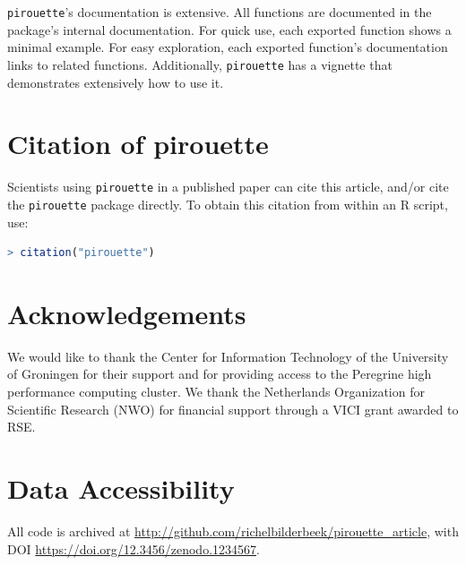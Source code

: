 \documentclass{article}
\begin{document}
\verb;pirouette;'s documentation is extensive. All functions are documented
in the package's internal documentation. For quick use, 
each exported function shows a minimal example. 
For easy exploration, each exported function's documentation links to related functions.
Additionally, \verb;pirouette; has a vignette that demonstrates extensively how
to use it. 

\section{Citation of pirouette}

Scientists using \verb;pirouette; in a published paper can cite this
article, and/or cite the \verb;pirouette; package 
directly. To obtain this citation from within an R script, use:

\begin{lstlisting}[language=R]
> citation("pirouette")
\end{lstlisting}

\section{Acknowledgements}

We would like to thank the Center for Information Technology of the University 
of Groningen for their support and for providing access to the Peregrine 
high performance computing cluster. 
We thank the Netherlands 
Organization for Scientific Research (NWO) for financial support 
through a VICI grant awarded to RSE.

\section{Data Accessibility}

All code is archived at \url{http://github.com/richelbilderbeek/pirouette_article},
with DOI \url{https://doi.org/12.3456/zenodo.1234567}.

\end{document}

